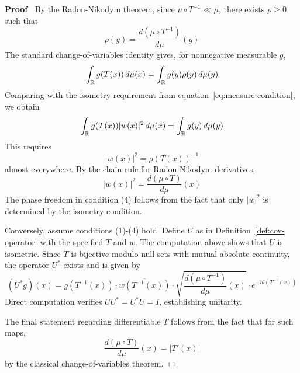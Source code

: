 \documentclass{article}
\newcommand{\tmtextbf}[1]{\text{{\bfseries{#1}}}}
\newenvironment{proof}{\noindent\textbf{Proof\ }}{\hspace*{\fill}$\Box$\medskip}
\begin{document}
\begin{proof}
  By the Radon-Nikodym theorem, since $\mu \circ T^{- 1} \ll \mu$, there
  exists $\rho \geq 0$ such that
  \begin{equation}
    \rho (y) = \frac{d (\mu \circ T^{- 1})}{d \mu} (y)
  \end{equation}
  The standard change-of-variables identity gives, for nonnegative measurable
  $g$,
  \begin{equation}
    \int_{\mathbb{R}} g (T (x))  \hspace{0.17em} d \mu (x) = \int_{\mathbb{R}}
    g (y) \rho (y)  \hspace{0.17em} d \mu (y)
  \end{equation}
  Comparing with the isometry requirement from
  equation~\eqref{eq:measure-condition}, we obtain
  \begin{equation}
    \int_{\mathbb{R}} g (T (x)) |w (x) |^2  \hspace{0.17em} d \mu (x) =
    \int_{\mathbb{R}} g (y)  \hspace{0.17em} d \mu (y)
  \end{equation}
  This requires
  \begin{equation}
    |w (x) |^2 = \rho (T (x))^{- 1}
  \end{equation}
  almost everywhere. By the chain rule for Radon-Nikodym derivatives,
  \begin{equation}
    |w (x) |^2 = \frac{d (\mu \circ T)}{d \mu} (x)
  \end{equation}
  The phase freedom in condition (4) follows from the fact that only $|w|^2$
  is determined by the isometry condition.
  
  \tmtextbf{Sufficiency:} Conversely, assume conditions (1)-(4) hold. Define
  $U$ as in Definition~\ref{def:cov-operator} with the specified $T$ and $w$.
  The computation above shows that $U$ is isometric. Since $T$ is bijective
  modulo null sets with mutual absolute continuity, the operator $U^{\ast}$
  exists and is given by
  \begin{equation}
    (U^{\ast} g) (x) = g (T^{- 1} (x)) \cdot \overline{w (T^{- 1} (x))} \cdot
    \sqrt{\frac{d (\mu \circ T^{- 1})}{d \mu} (x)} \cdot e^{- i \theta (T^{-
    1} (x))}
  \end{equation}
  Direct computation verifies $UU^{\ast} = U^{\ast} U = I$, establishing
  unitarity.
  
  The final statement regarding differentiable $T$ follows from the fact that
  for such maps,
  \begin{equation}
    \frac{d (\mu \circ T)}{d \mu} (x) = |T' (x) |
  \end{equation}
  by the classical change-of-variables theorem.
\end{proof}
\end{document}
